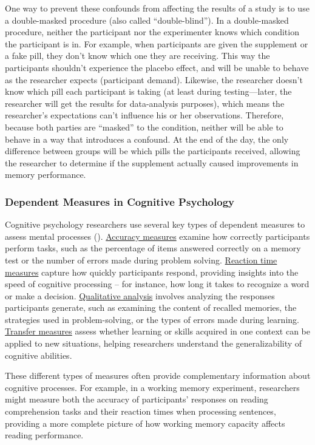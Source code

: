 \documentclass[
]{krantz}
\begin{document}
One way to prevent these confounds from affecting the results of a study is to use a double-masked procedure (also called ``double-blind''). In a double-masked procedure, neither the participant nor the experimenter knows which condition the participant is in. For example, when participants are given the supplement or a fake pill, they don't know which one they are receiving. This way the participants shouldn't experience the placebo effect, and will be unable to behave as the researcher expects (participant demand). Likewise, the researcher doesn't know which pill each participant is taking (at least during testing---later, the researcher will get the results for data-analysis purposes), which means the researcher's expectations can't influence his or her observations. Therefore, because both parties are ``masked'' to the condition, neither will be able to behave in a way that introduces a confound. At the end of the day, the only difference between groups will be which pills the participants received, allowing the researcher to determine if the supplement actually caused improvements in memory performance.

\subsubsection*{Dependent Measures in Cognitive Psychology}\label{dependent-measures-in-cognitive-psychology}


Cognitive psychology researchers use several key types of dependent measures to assess mental processes (). \hyperref[accuracy-measures]{Accuracy measures} examine how correctly participants perform tasks, such as the percentage of items answered correctly on a memory test or the number of errors made during problem solving. \hyperref[reaction-time-measures]{Reaction time measures} capture how quickly participants respond, providing insights into the speed of cognitive processing -- for instance, how long it takes to recognize a word or make a decision. \hyperref[qualitative-analysis]{Qualitative analysis} involves analyzing the responses participants generate, such as examining the content of recalled memories, the strategies used in problem-solving, or the types of errors made during learning. \hyperref[transfer-measures]{Transfer measures} assess whether learning or skills acquired in one context can be applied to new situations, helping researchers understand the generalizability of cognitive abilities.

These different types of measures often provide complementary information about cognitive processes. For example, in a working memory experiment, researchers might measure both the accuracy of participants' responses on reading comprehension tasks and their reaction times when processing sentences, providing a more complete picture of how working memory capacity affects reading performance.
\end{document}
